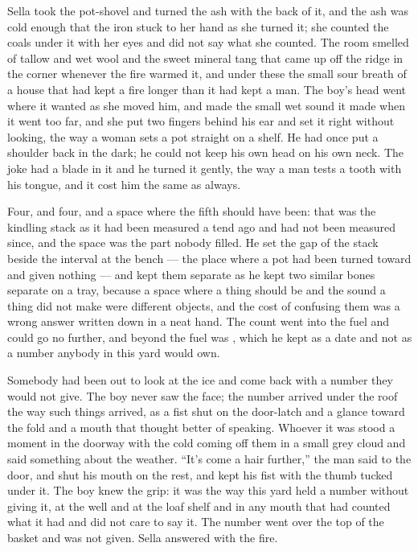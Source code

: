 Sella took the pot-shovel and turned the ash with the back of it, and the ash was cold enough that the iron stuck to her hand as she turned it; she counted the coals under it with her eyes and did not say what she counted. The room smelled of tallow and wet wool and the sweet mineral tang that came up off the ridge in the corner whenever the fire warmed it, and under these the small sour breath of a house that had kept a fire longer than it had kept a man. The boy's head went where it wanted as she moved him, and made the small wet sound it made when it went too far, and she put two fingers behind his ear and set it right without looking, the way a woman sets a pot straight on a shelf. He had once put a shoulder back in the dark; he could not keep his own head on his own neck. The joke had a blade in it and he turned it gently, the way a man tests a tooth with his tongue, and it cost him the same as always.

Four, and four, and a space where the fifth should have been: that was the kindling stack as it had been measured a tend ago and had not been measured since, and the space was the part nobody filled. He set the gap of the stack beside the interval at the bench --- the place where a pot had been turned toward and given nothing --- and kept them separate as he kept two similar bones separate on a tray, because a space where a thing should be and the sound a thing did not make were different objects, and the cost of confusing them was a wrong answer written down in a neat hand. The count went into the fuel and could go no further, and beyond the fuel was , which he kept as a date and not as a number anybody in this yard would own.

Somebody had been out to look at the ice and come back with a number they would not give. The boy never saw the face; the number arrived under the roof the way such things arrived, as a fist shut on the door-latch and a glance toward the fold and a mouth that thought better of speaking. Whoever it was stood a moment in the doorway with the cold coming off them in a small grey cloud and said something about the weather. “It's come a hair further,” the man said to the door, and shut his mouth on the rest, and kept his fist with the thumb tucked under it. The boy knew the grip: it was the way this yard held a number without giving it, at the well and at the loaf shelf and in any mouth that had counted what it had and did not care to say it. The number went over the top of the basket and was not given. Sella answered with the fire.


